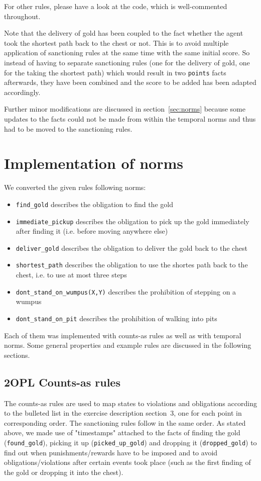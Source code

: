 \documentclass[a4paper,11pt]{article}
\begin{document}
For other rules, please have a look at the code, which is well-commented throughout.

Note that the delivery of gold has been coupled to the fact whether the agent took the shortest path back to the chest or not. This is to avoid multiple application of sanctioning rules at the same time with the same initial score. So instead of having to separate sanctioning rules (one for the delivery of gold, one for the taking the shortest path) which would result in two \texttt{points} facts afterwards, they have been combined and the score to be added has been adapted accordingly.

Further minor modifications are discussed in section~\ref{sec:norms} because some updates to the facts could not be made from within the temporal norms and thus had to be moved to the sanctioning rules.

\section{Implementation of norms}
We converted the given rules following norms:
\begin{itemize}
  \item \texttt{find\_gold} describes the obligation to find the gold
  \item \texttt{immediate\_pickup} describes the obligation to pick up the gold immediately after finding it (i.e. before moving anywhere else)
  \item \texttt{deliver\_gold} describes the obligation to deliver the gold back to the chest
  \item \texttt{shortest\_path} describes the obligation to use the shortes path back to the chest, i.e. to use at most three steps
  \item \texttt{dont\_stand\_on\_wumpus(X,Y)} describes the prohibition of stepping on a wumpus
  \item \texttt{dont\_stand\_on\_pit} describes the prohibition of walking into pits
\end{itemize}

Each of them was implemented with counts-as rules as well as with temporal norms. Some general properties and example rules are discussed in the following sections.

\subsection{2OPL Counts-as rules}
\label{sec:counts}
The counts-as rules are used to map states to violations and obligations according to the bulleted list in the exercise description section~3, one for each point in corresponding order. The sanctioning rules follow in the same order. As stated above, we made use of "timestamps" attached to the facts of finding the gold (\texttt{found\_gold}), picking it up (\texttt{picked\_up\_gold}) and dropping it (\texttt{dropped\_gold}) to find out when punishments/rewards have to be imposed and to avoid obligations/violations after certain events took place (such as the first finding of the gold or dropping it into the chest).
\end{document}
